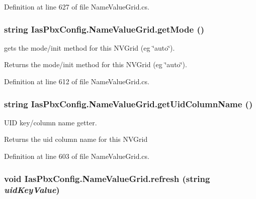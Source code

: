 Definition at line 627 of file NameValueGrid.cs.\hypertarget{class_ias_pbx_config_1_1_name_value_grid_a1ec8a16694d06cb32dfd0874c762e41c}{
\subsubsection[{getMode}]{\setlength{\rightskip}{0pt plus 5cm}string IasPbxConfig.NameValueGrid.getMode ()}}
\label{class_ias_pbx_config_1_1_name_value_grid_a1ec8a16694d06cb32dfd0874c762e41c}


gets the mode/init method for this NVGrid (eg \char`\"{}auto\char`\"{}). \begin{DoxyReturn}{Returns}
the mode/init method for this NVGrid (eg \char`\"{}auto\char`\"{}). 
\end{DoxyReturn}


Definition at line 612 of file NameValueGrid.cs.\hypertarget{class_ias_pbx_config_1_1_name_value_grid_a9074cc4353c1d1d39d78d67f2db36c70}{
\subsubsection[{getUidColumnName}]{\setlength{\rightskip}{0pt plus 5cm}string IasPbxConfig.NameValueGrid.getUidColumnName ()}}
\label{class_ias_pbx_config_1_1_name_value_grid_a9074cc4353c1d1d39d78d67f2db36c70}


UID key/column name getter. \begin{DoxyReturn}{Returns}
the uid column name for this NVGrid 
\end{DoxyReturn}


Definition at line 603 of file NameValueGrid.cs.\hypertarget{class_ias_pbx_config_1_1_name_value_grid_a99e4cae8063bc38014c310a90e59b779}{
\subsubsection[{refresh}]{\setlength{\rightskip}{0pt plus 5cm}void IasPbxConfig.NameValueGrid.refresh (string {\em uidKeyValue})}}
\label{class_ias_pbx_config_1_1_name_value_grid_a99e4cae8063bc38014c310a90e59b779}


